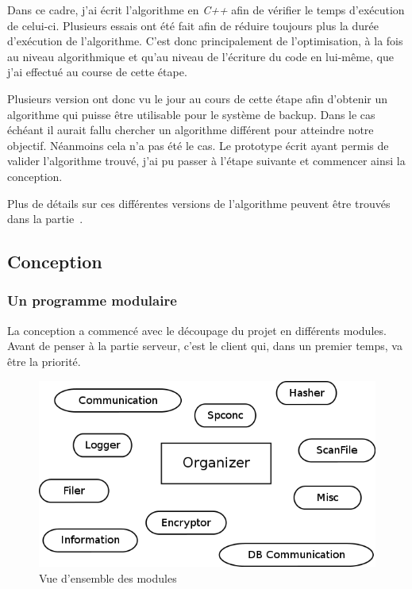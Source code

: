 \documentclass[a4paper,10pt, twoside]{report}
\begin{document}
\begin{spacing}{1.2}
Dans ce cadre, j'ai \'ecrit l'algorithme en \textit{C++} afin de v\'erifier
le temps d'ex\'ecution de celui-ci. Plusieurs essais ont \'et\'e fait afin de
r\'eduire toujours plus la dur\'ee d'ex\'ecution de l'algorithme. C'est donc
principalement de l'optimisation, \`a la fois au niveau algorithmique et
qu'au niveau de l'\'ecriture du code en lui-m\^eme, que j'ai effectu\'e  au
course de cette \'etape.

Plusieurs version ont donc vu le jour au cours de cette \'etape afin d'obtenir
un algorithme qui puisse \^etre utilisable pour le syst\`eme de backup. Dans
le cas \'ech\'eant il aurait fallu chercher un algorithme diff\'erent pour
atteindre notre objectif. N\'eanmoins cela n'a pas \'et\'e le cas. Le
prototype \'ecrit ayant permis de valider l'algorithme trouv\'e, j'ai pu passer
\`a l'\'etape suivante et commencer ainsi la conception.

Plus de d\'etails sur ces diff\'erentes versions de l'algorithme peuvent \^etre
trouv\'es dans la partie~.

\subsection{Conception}
\subsubsection{Un programme modulaire}
La conception a commenc\'e avec le d\'ecoupage du projet en diff\'erents
modules. Avant de penser \`a la partie serveur, c'est le client qui, dans un
premier temps, va \^etre la priorit\'e.

\begin{figure}[h!]
  \centering
  \includegraphics[scale=0.51]{softwareDesign/overviewModule.png}
  \caption{\label{overviewModule} Vue d'ensemble des modules}
\end{figure}


\end{spacing}
\end{document}
